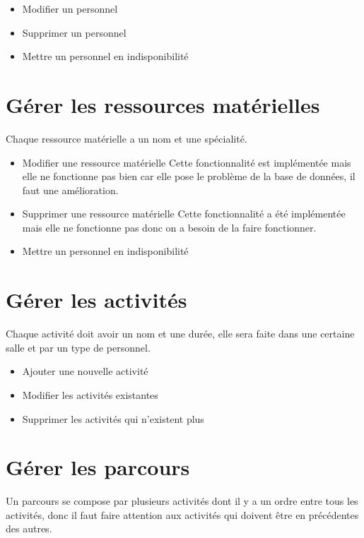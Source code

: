 \documentclass{polytech/polytech}
\begin{document}
\begin{itemize}
	\item Modifier un personnel
	\item Supprimer un personnel
	\item Mettre un personnel en indisponibilité
\end{itemize}

\section{Gérer les ressources matérielles}

Chaque ressource matérielle a un nom et une spécialité.

\begin{itemize}
	\item Modifier une ressource matérielle Cette fonctionnalité est implémentée mais elle ne fonctionne pas bien car elle pose le problème de la base de données, il faut une amélioration.
	\item Supprimer une ressource matérielle Cette fonctionnalité a été implémentée mais elle ne fonctionne pas donc on a besoin de la faire fonctionner.
	\item Mettre un personnel en indisponibilité
\end{itemize}

\section{Gérer les activités}

Chaque activité doit avoir un nom et une durée, elle sera faite dans une certaine salle et par un type de personnel.

\begin{itemize}
	\item Ajouter une nouvelle activité
	\item Modifier les activités existantes
	\item Supprimer les activités qui n’existent plus
\end{itemize}


\section{Gérer les parcours}

Un parcours se compose par plusieurs activités dont il y a un ordre entre tous les activités, donc il faut faire attention aux activités qui doivent être en précédentes des autres.
\end{document}
